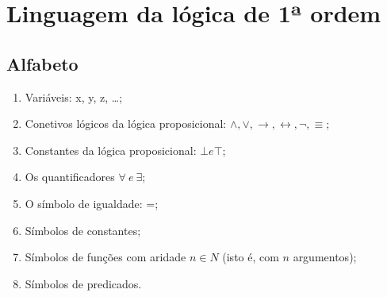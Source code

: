 \documentclass[11pt]{report}
\begin{document}
    \section*{Linguagem da lógica de 1ª ordem} {
    \subsection*{Alfabeto} {
    \begin{enumerate}
        \item Variáveis: x, y, z, \ldots;
        \item Conetivos lógicos da lógica proposicional: $\wedge, \vee, \rightarrow, \leftrightarrow, \neg, \equiv$;
        \item Constantes da lógica proposicional: $\bot e \top$;
        \item Os quantificadores $\forall~e~\exists$;
        \item O símbolo de igualdade: =;
        \item Símbolos de constantes;
        \item Símbolos de funções com aridade $n \in N$ (isto é, com $n$ argumentos);
        \item Símbolos de predicados.
    \end{enumerate}
    }
}
\end{document}
